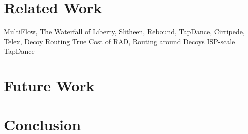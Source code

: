 \documentclass[letterpaper,twocolumn,10pt]{article}
\begin{document}




\section{Related Work}

MultiFlow, The Waterfall of Liberty, Slitheen, Rebound, TapDance, Cirripede, Telex, Decoy Routing
True Cost of RAD, Routing around Decoys
ISP-scale TapDance


\section{Future Work}

\section{Conclusion}

%



\end{document}
